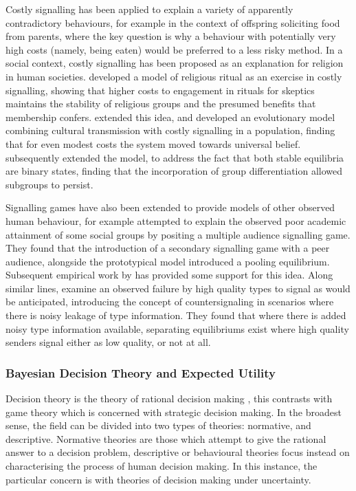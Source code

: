 Costly signalling has been applied to explain a variety of apparently
contradictory behaviours, for example \citet{Godfray1991} in the
context of offspring soliciting food from parents, where the key question
is why a behaviour with potentially very high costs (namely, being
eaten) would be preferred to a less risky method. In a social context,
costly signalling has been proposed as an explanation for religion
in human societies. \citet{Sosis2003} developed a model of religious
ritual as an exercise in costly signalling, showing that higher costs
to engagement in rituals for skeptics maintains the stability of religious
groups and the presumed benefits that membership confers. \citet{Henrich2009}
extended this idea, and developed an evolutionary model combining
cultural transmission with costly signalling in a population, finding
that for even modest costs the system moved towards universal belief.
\citet{Wildman2011} subsequently extended the model, to address the
fact that both stable equilibria are binary states, finding that the
incorporation of group differentiation allowed subgroups to persist.

Signalling games have also been extended to provide models of other
observed human behaviour, for example \citet{Austen-Smith2005} attempted
to explain the observed poor academic attainment of some social groups
by positing a multiple audience signalling game. They found that the
introduction of a secondary signalling game with a peer audience,
alongside the prototypical \citeauthor{Spence1973} model introduced
a pooling equilibrium. Subsequent empirical work by \citet{Jr2010}
has provided some support for this idea. Along similar lines, \citet{Feltovich2002}
examine an observed failure by high quality types to signal as would
be anticipated, introducing the concept of countersignaling in scenarios
where there is noisy leakage of type information. They found that
where there is added noisy type information available, separating
equilibriums exist where high quality senders signal either as low
quality, or not at all.


\subsubsection{Bayesian Decision Theory and Expected Utility}

Decision theory is the theory of rational decision making \citep{Peterson2009},
this contrasts with game theory which is concerned with strategic
decision making. In the broadest sense, the field can be divided into
two types of theories: normative, and descriptive. Normative theories
are those which attempt to give the rational answer to a decision
problem, descriptive or behavioural theories focus instead on characterising
the process of human decision making. In this instance, the particular
concern is with theories of decision making under uncertainty.

